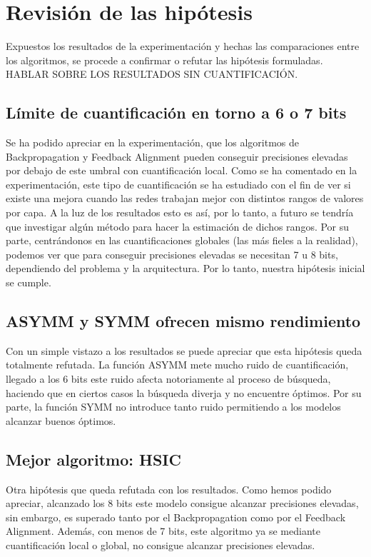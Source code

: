 \section{Revisión de las hipótesis}

Expuestos los resultados de la experimentación y hechas las comparaciones entre los algoritmos, se procede a confirmar o refutar las hipótesis formuladas. HABLAR SOBRE LOS RESULTADOS SIN CUANTIFICACIÓN.

\subsection{Límite de cuantificación en torno a 6 o 7 bits}
Se ha podido apreciar en la experimentación, que los algoritmos de Backpropagation y Feedback Alignment pueden conseguir precisiones elevadas por debajo de este umbral con cuantificación local. Como se ha comentado en la experimentación, este tipo de cuantificación se ha estudiado con el fin de ver si existe una mejora cuando las redes trabajan mejor con distintos rangos de valores por capa. A la luz de los resultados esto es así, por lo tanto, a futuro se tendría que investigar algún método para hacer la estimación de dichos rangos. Por su parte, centrándonos en las cuantificaciones globales (las más fieles a la realidad), podemos ver que para conseguir precisiones elevadas se necesitan 7 u 8 bits, dependiendo del problema y la arquitectura. Por lo tanto, nuestra hipótesis inicial se cumple.

\subsection{ASYMM y SYMM ofrecen mismo rendimiento}

Con un simple vistazo a los resultados se puede apreciar que esta hipótesis queda totalmente refutada. La función ASYMM mete mucho ruido de cuantificación, llegado a los 6 bits este ruido afecta notoriamente al proceso de búsqueda, haciendo que en ciertos casos la búsqueda diverja y no encuentre óptimos. Por su parte, la función SYMM no introduce tanto ruido permitiendo a los modelos alcanzar buenos óptimos.

\subsection{Mejor algoritmo: HSIC}

Otra hipótesis que queda refutada con los resultados. Como hemos podido apreciar, alcanzado los 8 bits este modelo consigue alcanzar precisiones elevadas, sin embargo, es superado tanto por el Backpropagation como por el Feedback Alignment. Además, con menos de 7 bits, este algoritmo ya se mediante cuantificación local o global, no consigue alcanzar precisiones elevadas.


